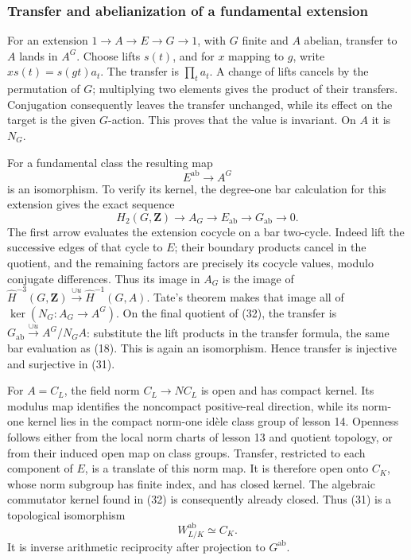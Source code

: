 \documentclass[11pt,a4paper]{article}
\begin{document}
\subsubsection{Transfer and abelianization of a fundamental
extension}\label{transfer-and-abelianization-of-a-fundamental-extension}

For an extension \(1\to A\to E\to G\to1\), with \(G\) finite and \(A\)
abelian, transfer to \(A\) lands in \(A^G\). Choose lifts \(s(t)\), and
for \(x\) mapping to \(g\), write \(xs(t)=s(gt)a_t\). The transfer is
\(\prod_t a_t\). A change of lifts cancels by the permutation of \(G\);
multiplying two elements gives the product of their transfers.
Conjugation consequently leaves the transfer unchanged, while its effect
on the target is the given \(G\)-action. This proves that the value is
invariant. On \(A\) it is \(N_G\).

For a fundamental class the resulting map \[
E^{\mathrm{ab}}\longrightarrow A^G
\tag{31}
\] is an isomorphism. To verify its kernel, the degree-one bar
calculation for this extension gives the exact sequence \[
H_2(G,\mathbf Z)\longrightarrow A_G
\longrightarrow E_{\mathrm{ab}}\longrightarrow G_{\mathrm{ab}}\to0.
\tag{32}
\] The first arrow evaluates the extension cocycle on a bar two-cycle.
Indeed lift the successive edges of that cycle to \(E\); their boundary
products cancel in the quotient, and the remaining factors are precisely
its cocycle values, modulo conjugate differences. Thus its image in
\(A_G\) is the image of
\(\widehat H^{-3}(G,\mathbf Z)\xrightarrow{\cup u}\widehat H^{-1}(G,A)\).
Tate's theorem makes that image all of \(\ker(N_G:A_G\to A^G)\). On the
final quotient of (32), the transfer is
\(G_{\mathrm{ab}}\xrightarrow{\cup u}A^G/N_GA\): substitute the lift
products in the transfer formula, the same bar evaluation as (18). This
is again an isomorphism. Hence transfer is injective and surjective in
(31).

For \(A=C_L\), the field norm \(C_L\to NC_L\) is open and has compact
kernel. Its modulus map identifies the noncompact positive-real
direction, while its norm-one kernel lies in the compact norm-one idèle
class group of lesson 14. Openness follows either from the local norm
charts of lesson 13 and quotient topology, or from their induced open
map on class groups. Transfer, restricted to each component of \(E\), is
a translate of this norm map. It is therefore open onto \(C_K\), whose
norm subgroup has finite index, and has closed kernel. The algebraic
commutator kernel found in (32) is consequently already closed. Thus
(31) is a topological isomorphism \[
W_{L/K}^{\mathrm{ab}}\simeq C_K.
\tag{33}
\] It is inverse arithmetic reciprocity after projection to
\(G^{\mathrm{ab}}\).
\end{document}
